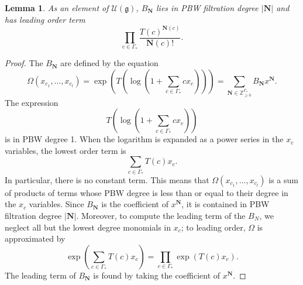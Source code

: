 \documentclass[10pt]{article}
\newtheorem{lemma}[theorem]{Lemma}
\theoremstyle{definition}
\begin{document}
\begin{lemma} \label{leading_term_lemma}
As an element of $\mathcal{U}(\mathfrak{g})$, $B_{\mathbf{N}}$ lies in PBW filtration degree $|\mathbf{N}|$ and has leading order term
\[
\prod_{c \in \Gamma_*} \frac{T(c)^{\mathbf{N}(c)}}{\mathbf{N}(c)!}.
\]
\end{lemma}
\begin{proof}
The $B_{\mathbf{N}}$ are defined by the equation
\[
\Omega(x_{c_1}, \ldots, x_{c_l}) = \exp\left(T\left(\log\left(1 + \sum_{c \in \Gamma_*} c x_c\right)\right)\right) = \sum_{\mathbf{N} \in \mathbb{Z}_{\geq 0}^{\Gamma_*}} B_{\mathbf{N}} x^{\mathbf{N}}.
\]
The expression
\[
T\left(\log\left(1 + \sum_{c \in \Gamma_*} c x_c\right)\right)
\]
is in PBW degree 1. When the logarithm is expanded as a power series in the $x_c$ variables, the lowest order term is
\[
\sum_{c \in \Gamma_*} T(c) x_c.
\]
In particular, there is no constant term. This means that $\Omega(x_{c_1}, \ldots, x_{c_l})$ is a sum of products of terms whose PBW degree is less than or equal to their degree in the $x_c$ variables. Since $B_{\mathbf{N}}$ is the coefficient of $x^{\mathbf{N}}$, it is contained in PBW filtration degree $|\mathbf{N}|$. Moreover, to compute the leading term of the $B_N$, we neglect all but the lowest degree monomials in $x_c$; to leading order, $\Omega$ is approximated by
\[
\exp\left( \sum_{c \in \Gamma_*} T(c) x_c\right) = 
\prod_{c \in \Gamma_*} \exp\left( T(c) x_c\right).
\]
The leading term of $B_{\mathbf{N}}$ is found by taking the coefficient of $x^{\mathbf{N}}$.
\end{proof}
\end{document}
